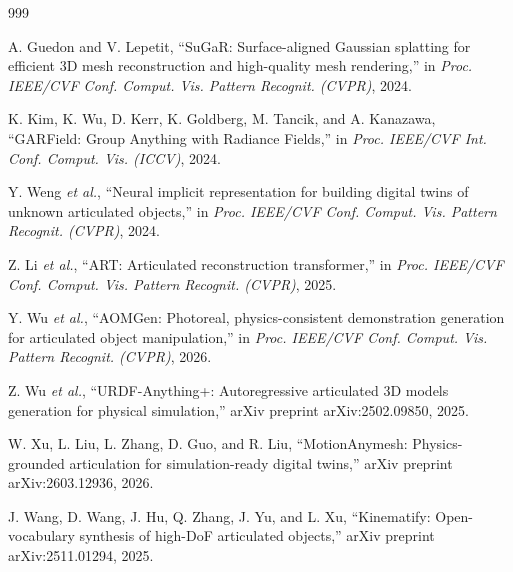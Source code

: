 \documentclass[11pt,a4paper]{article}
\begin{document}
\begin{thebibliography}{999}

A. Guedon and V. Lepetit, ``{SuGaR}: Surface-aligned {Gaussian} splatting for efficient {3D} mesh reconstruction and high-quality mesh rendering,'' in \textit{Proc. IEEE/CVF Conf. Comput. Vis. Pattern Recognit. (CVPR)}, 2024.





K. Kim, K. Wu, D. Kerr, K. Goldberg, M. Tancik, and A. Kanazawa, ``GARField: Group Anything with Radiance Fields,'' in \textit{Proc. IEEE/CVF Int. Conf. Comput. Vis. (ICCV)}, 2024.




Y. Weng \textit{et al.}, ``Neural implicit representation for building digital twins of unknown articulated objects,'' in \textit{Proc. IEEE/CVF Conf. Comput. Vis. Pattern Recognit. (CVPR)}, 2024.




Z. Li \textit{et al.}, ``{ART}: Articulated reconstruction transformer,'' in \textit{Proc. IEEE/CVF Conf. Comput. Vis. Pattern Recognit. (CVPR)}, 2025.




Y. Wu \textit{et al.}, ``{AOMGen}: Photoreal, physics-consistent demonstration generation for articulated object manipulation,'' in \textit{Proc. IEEE/CVF Conf. Comput. Vis. Pattern Recognit. (CVPR)}, 2026.




Z. Wu \textit{et al.}, ``{URDF-Anything+}: Autoregressive articulated {3D} models generation for physical simulation,'' arXiv preprint arXiv:2502.09850, 2025.




W. Xu, L. Liu, L. Zhang, D. Guo, and R. Liu, ``{MotionAnymesh}: Physics-grounded articulation for simulation-ready digital twins,'' arXiv preprint arXiv:2603.12936, 2026.




J. Wang, D. Wang, J. Hu, Q. Zhang, J. Yu, and L. Xu, ``Kinematify: Open-vocabulary synthesis of high-{DoF} articulated objects,'' arXiv preprint arXiv:2511.01294, 2025.




\end{thebibliography}
\end{document}
